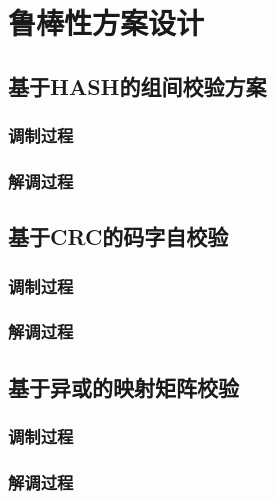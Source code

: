 \section{鲁棒性方案设计}
\label{chap:hash:robustness}

\subsection{基于HASH的组间校验方案}
\label{chap:hash:robustness:hash}

\subsubsection{调制过程}
\label{chap:hash:robustness:hash:modulation}

\subsubsection{解调过程}
\label{chap:hash:robustness:hash:demodulation}

\subsection{基于CRC的码字自校验}
\label{chap:hash:robustness:crc}

\subsubsection{调制过程}
\label{chap:hash:robustness:crc:modulation}

\subsubsection{解调过程}
\label{chap:hash:robustness:crc:demodulation}

\subsection{基于异或的映射矩阵校验}
\label{chap:hash:robustness:xor}

\subsubsection{调制过程}
\label{chap:hash:robustness:xor:modulation}

\subsubsection{解调过程}
\label{chap:hash:robustness:xor:demodulation}
